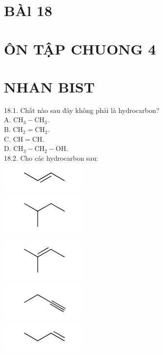\documentclass[10pt]{article}
\begin{document}
\section*{BÀl 18}
\section*{ÔN TẬP CHUONG 4}
\section*{NHAN BIST}
18.1. Chất nào sau đây không phải là hydrocarbon?\\
A. $\mathrm{CH}_{3}-\mathrm{CH}_{3}$.\\
B. $\mathrm{CH}_{2}=\mathrm{CH}_{2}$.\\
C. $\mathrm{CH}=\mathrm{CH}$.\\
D. $\mathrm{CH}_{3}-\mathrm{CH}_{2}-\mathrm{OH}$.\\
18.2. Cho các hydrocarbon sau:\\
\includegraphics{smile-125fc74a40ef3561e9e0b939a344656fc770676e}\\
\includegraphics{smile-13b100b8888d222ef7dd5acee0aebb7e05e452df}\\
\includegraphics{smile-57328846cad84dd225af1bff9432f8ba9af23479}\\
\includegraphics{smile-c69a8eae60cd42899bc6b56ffc474be9f3600368}\\
\includegraphics{smile-04c8fbf978c86cc6929fa571e361d8b3a4133d11}\\
\end{document}
